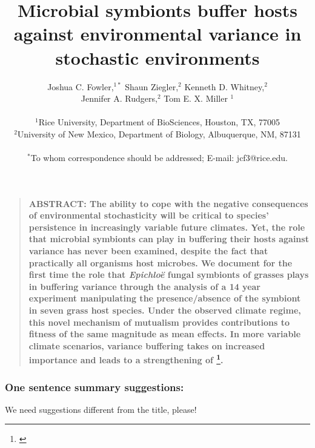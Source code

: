 \documentclass[12pt]{article}
\title{Microbial symbionts buffer hosts against environmental variance in stochastic environments}
\author
{Joshua C. Fowler,$^{1\ast}$ Shaun Ziegler,$^{2}$ Kenneth D. Whitney,$^{2}$\\
	 Jennifer A. Rudgers,$^{2}$ Tom E. X. Miller $^{1}$\\
\\
\normalsize{$^{1}$Rice University, Department of BioSciences, Houston, TX, 77005}\\
\normalsize{$^{2}$University of New Mexico, Department of Biology, Albuquerque, NM, 87131}\\
\\
\normalsize{$^\ast$To whom correspondence should be addressed; E-mail:  jcf3@rice.edu.}
}
\date{}
\newcommand{\josh}[2]{{\color{blue}{#1}}\footnote{\textit{\color{blue}{#2}}}}
\newenvironment{sciabstract}{%
\begin{quote} \bf}
{\end{quote}}
\begin{document}
 


\baselineskip24pt


\maketitle 



\begin{sciabstract}
	ABSTRACT: 
    The ability to cope with the negative consequences of environmental stochasticity will be critical to species' persistence in increasingly variable future climates. 
	Yet, the role that microbial symbionts can play in buffering their hosts against variance has never been examined, despite the fact that practically all organisms host microbes. 
	We document for the first time the role that \emph{Epichlo\"{e}} fungal symbionts of grasses plays in buffering variance through the analysis of a 14 year experiment manipulating the presence/absence of the symbiont in seven grass host species.
	Under the observed climate regime, this novel mechanism of mutualism provides contributions to fitness of the same magnitude as mean effects.
	In more variable climate scenarios, variance buffering takes on increased importance and leads to a strengthening of \josh{mutualism}{The abstract is limited to 125 words.}. 

\end{sciabstract}


\subsubsection*{One sentence summary suggestions:}
We need suggestions different from the title, please!

\end{document}
